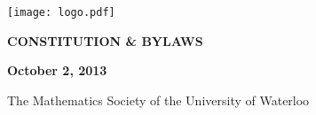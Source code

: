 \documentclass[11pt]{article}
\begin{document}
\begin{titlepage}\begin{center}
\sffamily
\texttt{[image: logo.pdf]}

\vspace{10em}

{\Huge \bfseries CONSTITUTION \& BYLAWS}

\vspace{3em}

{\LARGE \bfseries October 2, 2013}

\vspace{7em}

{\LARGE The Mathematics Society of the University of Waterloo}
\end{center}\end{titlepage}

\setcounter{tocdepth}{4}
{\large \sffamily \tableofcontents}

\newpage


\end{document}
